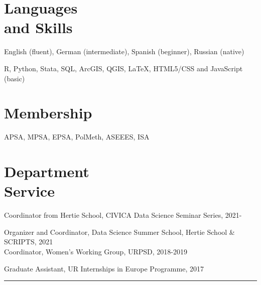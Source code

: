 \documentclass[margin,line,11pt]{res}
\begin{document}
\begin{resume}
\section{\sc Languages \\ and Skills}
English (fluent), German (intermediate), Spanish (beginner), Russian (native)
\vspace*{-4.5mm}

R, Python, Stata, SQL, ArcGIS, QGIS, \LaTeX , HTML5/CSS and JavaScript (basic) 
\vspace*{-2.5mm}

\section{\sc Membership}

APSA, MPSA, EPSA, PolMeth, ASEEES, ISA

\section{\sc Department \\ Service}
Coordinator from Hertie School, CIVICA Data Science Seminar Series, 2021-
\vspace*{-4.5mm}

Organizer and Coordinator, Data Science Summer School, Hertie School \& SCRIPTS, 2021
\\
Coordinator, Women's Working Group,  URPSD,  2018-2019
\vspace*{-4.5mm}

Graduate Assistant, UR Internships in Europe Programme,  2017

\begin{center}
	\noindent\rule{8cm}{0.4pt}
\end{center}
\vspace{1em}


\end{resume}
\end{document}
